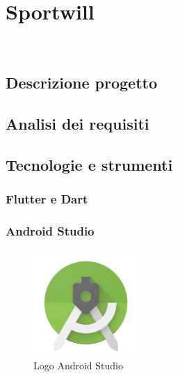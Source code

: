 
\chapter{Sportwill}
\label{cap:Sportwill}

\\


\section{Descrizione progetto}

\section{Analisi dei requisiti}

\section{Tecnologie e strumenti}

\subsection{Flutter e Dart}

\subsection{Android Studio}

\begin{figure}[htbp]	
	\centering
	\includegraphics[width=4cm]{immagini/logoandroidstudio.png}
	\caption{Logo Android Studio}
	\label{fig:Logo Android Studio}
\end{figure}

